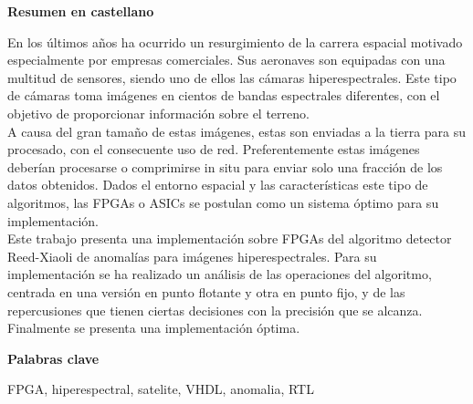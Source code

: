 
\newpage

\thispagestyle{empty}

\begin{center}

{\bf \Huge Resumen en castellano}

  \end{center}
\vspace{1cm}

En los últimos años ha ocurrido un resurgimiento de la carrera espacial motivado especialmente por empresas comerciales. Sus aeronaves son equipadas con una multitud de sensores, siendo uno de ellos las cámaras hiperespectrales. Este tipo de cámaras toma imágenes en cientos de bandas espectrales diferentes, con el objetivo de proporcionar información sobre el terreno.
\\
A causa del gran tamaño de estas imágenes, estas son enviadas a la tierra para su procesado, con el consecuente uso de red. Preferentemente estas imágenes deberían procesarse o comprimirse in situ para enviar solo una fracción de los datos obtenidos. Dados el entorno espacial y las características este tipo de algoritmos, las FPGAs o ASICs se postulan como un sistema óptimo para su implementación.
\\
Este trabajo presenta una implementación sobre FPGAs del algoritmo detector Reed-Xiaoli de anomalías para imágenes hiperespectrales. Para su implementación se ha realizado un análisis de las operaciones del algoritmo, centrada en una versión en punto flotante y otra en punto fijo, y de las repercusiones que tienen ciertas decisiones con la precisión que se alcanza.
\\
Finalmente se presenta una implementación óptima.



\vspace{1cm}


\begin{center}

{\bf \Large Palabras clave}

   \end{center}

   \vspace{0.5cm}
   
   FPGA, hiperespectral, satelite, VHDL, anomalia, RTL
   


